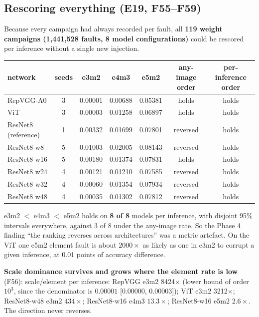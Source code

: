 \subsection{Rescoring everything (E19, F55--F59)}
Because every campaign had always recorded  per fault, all \textbf{119 weight campaigns (1{,}441{,}528 faults, 8 model configurations)} could be rescored per inference without a single new injection.
\begin{center}
\small
\begin{tabular}{lcccccc}
\toprule
network & seeds & e3m2 & e4m3 & e5m2 & any-image order & per-inference order \\
\midrule
RepVGG-A0 & 3 & 0.00001 & 0.00688 & 0.05381 & holds & holds \\
ViT & 3 & 0.00003 & 0.01258 & 0.06897 & holds & holds \\
ResNet8 (reference) & 1 & 0.00332 & 0.01699 & 0.07801 & reversed & holds \\
ResNet8 w8 & 5 & 0.01003 & 0.02005 & 0.08143 & reversed & holds \\
ResNet8 w16 & 5 & 0.00180 & 0.01374 & 0.07831 & holds & holds \\
ResNet8 w24 & 4 & 0.00121 & 0.01210 & 0.07585 & reversed & holds \\
ResNet8 w32 & 4 & 0.00060 & 0.01354 & 0.07934 & reversed & holds \\
ResNet8 w48 & 4 & 0.00035 & 0.01302 & 0.07812 & reversed & holds \\
\bottomrule
\end{tabular}
\end{center}
e3m2 $<$ e4m3 $<$ e5m2 holds on \textbf{8 of 8} models per inference, with disjoint 95\% intervals everywhere, against 3 of 8 under the any-image rate. So the Phase 4 finding ``the ranking reverses across architectures'' was a metric artefact. On the ViT one e5m2 element fault is about $2000\times$ as likely as one in e3m2 to corrupt a given inference, at 0.01 points of accuracy difference.

\textbf{Scale dominance survives and grows where the element rate is low} (F56): scale/element per inference: RepVGG e3m2 8424$\times$ (lower bound of order $10^3$, since the denominator is $0.00001$ [0.00000, 0.00003]); ViT e3m2 3212$\times$; ResNet8-w48 e3m2 $434\times$; ResNet8-w16 e4m3 $13.3\times$; ResNet8-w16 e5m2 $2.6\times$. The direction never reverses.

